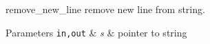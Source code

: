 remove\-\_\-new\-\_\-line remove new line from string. 


\begin{DoxyParams}[1]{Parameters}
\mbox{\tt in,out}  & {\em s} & pointer to string \\
\hline
\end{DoxyParams}
